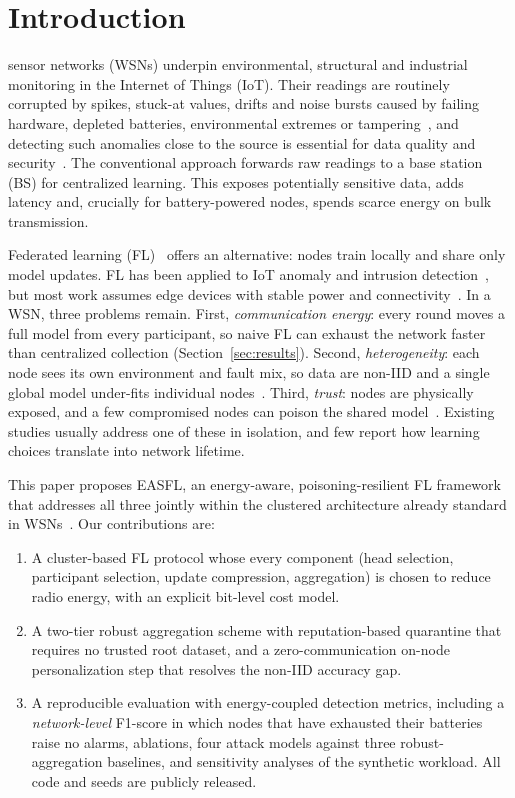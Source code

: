 \documentclass[journal,onecolumn,draftclsnofoot,12pt]{IEEEtran}
\begin{document}
\section{Introduction}
 sensor networks (WSNs) underpin environmental, structural and industrial monitoring in the Internet of Things (IoT). Their readings are routinely corrupted by spikes, stuck-at values, drifts and noise bursts caused by failing hardware, depleted batteries, environmental extremes or tampering~\cite{ni2009,sharma2010}, and detecting such anomalies close to the source is essential for data quality and security~\cite{rajasegarar2008}. The conventional approach forwards raw readings to a base station (BS) for centralized learning. This exposes potentially sensitive data, adds latency and, crucially for battery-powered nodes, spends scarce energy on bulk transmission.

Federated learning (FL)~\cite{mcmahan2017,kairouz2021} offers an alternative: nodes train locally and share only model updates. FL has been applied to IoT anomaly and intrusion detection~\cite{nguyen2019diot,mothukuri2022}, but most work assumes edge devices with stable power and connectivity~\cite{lim2020}. In a WSN, three problems remain. First, \emph{communication energy}: every round moves a full model from every participant, so naive FL can exhaust the network faster than centralized collection (Section~\ref{sec:results}). Second, \emph{heterogeneity}: each node sees its own environment and fault mix, so data are non-IID and a single global model under-fits individual nodes~\cite{zhao2018,hsu2019}. Third, \emph{trust}: nodes are physically exposed, and a few compromised nodes can poison the shared model~\cite{blanchard2017,fang2020}. Existing studies usually address one of these in isolation, and few report how learning choices translate into network lifetime.

This paper proposes EASFL, an energy-aware, poisoning-resilient FL framework that addresses all three jointly within the clustered architecture already standard in WSNs~\cite{heinzelman2002,younis2004,abbasi2007}. Our contributions are:
\begin{enumerate}
\item A cluster-based FL protocol whose every component (head selection, participant selection, update compression, aggregation) is chosen to reduce radio energy, with an explicit bit-level cost model.
\item A two-tier robust aggregation scheme with reputation-based quarantine that requires no trusted root dataset, and a zero-communication on-node personalization step that resolves the non-IID accuracy gap.
\item A reproducible evaluation with energy-coupled detection metrics, including a \emph{network-level} F1-score in which nodes that have exhausted their batteries raise no alarms, ablations, four attack models against three robust-aggregation baselines, and sensitivity analyses of the synthetic workload. All code and seeds are publicly released.
\end{enumerate}
\end{document}
